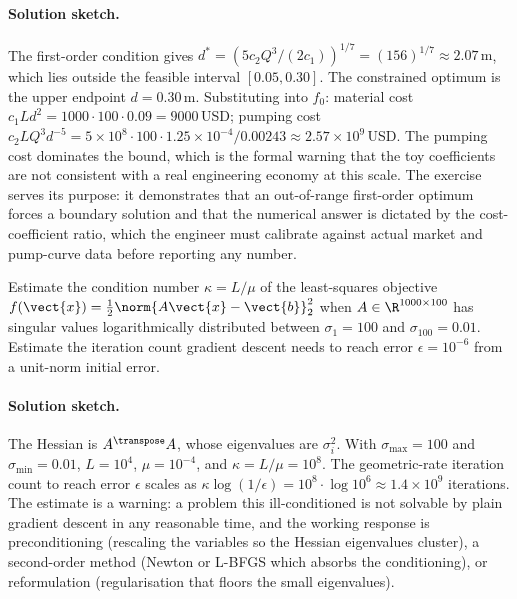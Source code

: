 \paragraph{Solution sketch.}
The first-order condition gives $d^{*} = (5 c_{2} Q^{3} / (2
c_{1}))^{1/7} = (156)^{1/7} \approx 2.07\,\si{\meter}$, which lies
outside the feasible interval $[0.05, 0.30]$. The constrained
optimum is the upper endpoint $d = 0.30\,\si{\meter}$. Substituting
into $f_{0}$: material cost $c_{1} L d^{2} = 1000 \cdot 100 \cdot
0.09 = 9000$\,USD; pumping cost $c_{2} L Q^{3} d^{-5} = 5 \times
10^{8} \cdot 100 \cdot 1.25 \times 10^{-4} / 0.00243 \approx 2.57
\times 10^{9}$\,USD. The pumping cost dominates the bound, which
is the formal warning that the toy coefficients are not consistent
with a real engineering economy at this scale. The exercise serves
its purpose: it demonstrates that an out-of-range first-order
optimum forces a boundary solution and that the numerical answer
is dictated by the cost-coefficient ratio, which the engineer must
calibrate against actual market and pump-curve data before
reporting any number.

\begin{exercise}
Estimate the condition number $\kappa = L/\mu$ of the
least-squares objective $f(\vect{x}) = \tfrac{1}{2} \norm{A
\vect{x} - \vect{b}}_{2}^{2}$ when $A \in \R^{1000 \times 100}$
has singular values logarithmically distributed between $\sigma_{1}
= 100$ and $\sigma_{100} = 0.01$. Estimate the iteration count
gradient descent needs to reach error $\epsilon = 10^{-6}$ from a
unit-norm initial error.
\end{exercise}

\paragraph{Solution sketch.}
The Hessian is $A^{\transpose} A$, whose eigenvalues are
$\sigma_{i}^{2}$. With $\sigma_{\max} = 100$ and $\sigma_{\min} =
0.01$, $L = 10^{4}$, $\mu = 10^{-4}$, and $\kappa = L/\mu =
10^{8}$. The geometric-rate iteration count to reach error
$\epsilon$ scales as $\kappa \log(1/\epsilon) = 10^{8} \cdot \log
10^{6} \approx 1.4 \times 10^{9}$ iterations. The estimate is a
warning: a problem this ill-conditioned is not solvable by plain
gradient descent in any reasonable time, and the working response
is preconditioning (rescaling the variables so the Hessian
eigenvalues cluster), a second-order method (Newton or L-BFGS
which absorbs the conditioning), or reformulation (regularisation
that floors the small eigenvalues).

